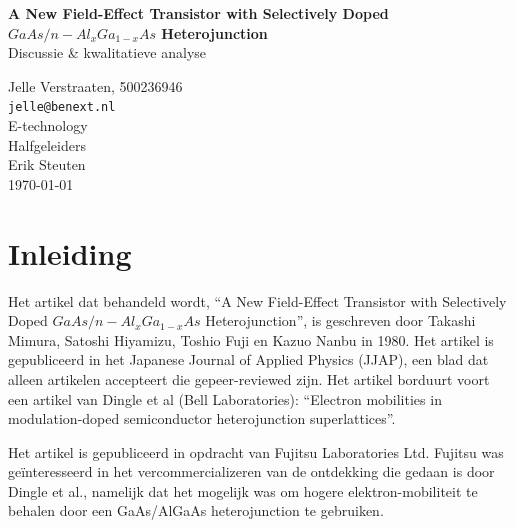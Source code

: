 \documentclass[11pt]{article}
\newlength{\leftbarwidth}
\newlength{\leftbarsep}
\newcommand*{\leftbarcolorcmd}{\color{leftbarcolor}}%
\renewenvironment{leftbar}{%
    \def\FrameCommand{{\leftbarcolorcmd{\vrule width \leftbarwidth\relax\hspace {\leftbarsep}}}}%
    \MakeFramed {\advance \hsize -\width \FrameRestore }}{\endMakeFramed}
\begin{document}
\begin{titlepage}
\begin{center}
{\huge\bfseries A New Field-Effect Transistor with Selectively Doped $GaAs/n-Al_{x}Ga_{1-x}As$ Heterojunction}
\\ \bigskip
{\Large Discussie \& kwalitatieve analyse}
\end{center}
\vfill
\begin{flushleft}
\setlength{\leftbarwidth}{1pt}
\begin{leftbar}
Jelle Verstraaten, 500236946 \\
\texttt{jelle@benext.nl} \\
E-technology \\
Halfgeleiders \\
Erik Steuten\\
{\small \today} \\
\end{leftbar}
\end{flushleft}
\end{titlepage}

\newpage
\tableofcontents
\newpage

\section{Inleiding}

Het artikel dat behandeld wordt, ``A New Field-Effect Transistor with Selectively Doped $GaAs/n-Al_{x}Ga_{1-x}As$ Heterojunction'', is geschreven door Takashi Mimura, Satoshi Hiyamizu, Toshio Fuji en Kazuo Nanbu in 1980. Het artikel is gepubliceerd in het Japanese Journal of Applied Physics (JJAP), een blad dat alleen artikelen accepteert die gepeer-reviewed zijn. Het artikel borduurt voort een artikel van Dingle et al (Bell Laboratories): ``Electron mobilities in modulation-doped semiconductor heterojunction superlattices''.

Het artikel is gepubliceerd in opdracht van Fujitsu Laboratories Ltd. Fujitsu was ge\"interesseerd in het vercommercializeren van de ontdekking die gedaan is door Dingle et al., namelijk dat het mogelijk was om hogere elektron-mobiliteit te behalen door een GaAs/AlGaAs heterojunction te gebruiken. %
\end{document}

